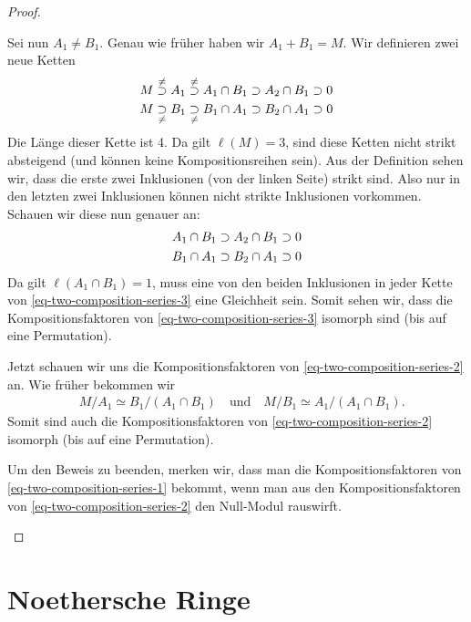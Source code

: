 \documentclass[reqno,12pt]{article}
\numberwithin{equation}{section}
\newcommand{\iso}{\simeq}
\theoremstyle{plain}
\theoremstyle{definition}
\begin{document}
\begin{proof}
\begin{enumerate}
Sei nun $A_1 \neq B_1$. Genau wie früher haben wir $A_1 + B_1 = M$. Wir definieren zwei neue Ketten
\begin{align}\label{eq-two-composition-series-2}
& M \overset{\neq}{\supset} A_1 \overset{\neq}{\supset} A_1 \cap B_1 \supset A_2 \cap B_1 \supset 0 \\ \notag
& M \underset{\neq}{\supset} B_1 \underset{\neq}{\supset} B_1 \cap A_1 \supset B_2 \cap A_1 \supset 0
\end{align}
Die Länge dieser Kette ist 4. Da gilt $\ell(M)=3$, sind diese Ketten nicht strikt absteigend (und können keine Kompositionsreihen sein). Aus der Definition sehen wir, dass die erste zwei Inklusionen (von der linken Seite) strikt sind. Also nur in den letzten zwei Inklusionen können nicht strikte Inklusionen vorkommen. Schauen wir diese nun genauer an:
\begin{align}\label{eq-two-composition-series-3}
&A_1 \cap B_1 \supset A_2 \cap B_1 \supset 0 \\ \notag
&B_1 \cap A_1 \supset B_2 \cap A_1 \supset 0
\end{align}
Da gilt $\ell(A_1 \cap B_1) = 1$, muss eine von den beiden Inklusionen in jeder Kette von \eqref{eq-two-composition-series-3} eine Gleichheit sein. Somit sehen wir, dass die Kompositionsfaktoren von \eqref{eq-two-composition-series-3} isomorph sind (bis auf eine Permutation).

Jetzt schauen wir uns die Kompositionsfaktoren von \eqref{eq-two-composition-series-2} an. Wie früher bekommen wir
\begin{align*}
& M/A_1 \iso B_1 / (A_1 \cap B_1) \quad \text{und} \quad M/B_1 \iso A_1 / (A_1 \cap B_1).
\end{align*}
Somit sind auch die Kompositionsfaktoren von \eqref{eq-two-composition-series-2} isomorph (bis auf eine Permutation).

Um den Beweis zu beenden, merken wir, dass man die Kompositionsfaktoren von \eqref{eq-two-composition-series-1} bekommt, wenn man aus den Kompositionsfaktoren von \eqref{eq-two-composition-series-2} den Null-Modul rauswirft.
\end{enumerate}
\end{proof}



\newpage
\section{Noethersche Ringe}
\end{document}
